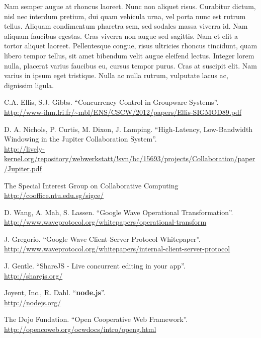 \documentclass[a4paper, 12pt, twoside]{book}
\begin{document}
Nam semper augue at rhoncus laoreet. Nunc non aliquet risus. Curabitur dictum, nisl nec interdum pretium, dui quam vehicula urna, vel porta nunc est rutrum tellus. Aliquam condimentum pharetra sem, sed sodales massa viverra id. Nam aliquam faucibus egestas. Cras viverra non augue sed sagittis. Nam et elit a tortor aliquet laoreet. Pellentesque congue, risus ultricies rhoncus tincidunt, quam libero tempor tellus, sit amet bibendum velit augue eleifend lectus. Integer lorem nulla, placerat varius faucibus eu, cursus tempor purus. Cras at suscipit elit. Nam varius in ipsum eget tristique. Nulla ac nulla rutrum, vulputate lacus ac, dignissim ligula.

\begin{thebibliography}{99}

 C.A. Ellis, S.J. Gibbs. “Concurrency Control in Groupware Systems”.
\\\url{http://www-ihm.lri.fr/~mbl/ENS/CSCW/2012/papers/Ellis-SIGMOD89.pdf}

 D. A. Nichols, P. Curtis, M. Dixon, J. Lamping. “High-Latency, Low-Bandwidth Windowing in the Jupiter Collaboration System”.
\\\url{http://lively-kernel.org/repository/webwerkstatt/!svn/bc/15693/projects/Collaboration/paper/Jupiter.pdf}

 The Special Interest Group on Collaborative Computing
\\\url{http://cooffice.ntu.edu.sg/sigce/}

 D. Wang, A. Mah, S. Lassen. “Google Wave Operational Transformation”.
\\\url{http://www.waveprotocol.org/whitepapers/operational-transform}

 J. Gregorio. “Google Wave Client-Server Protocol Whitepaper”.
\\\url{http://www.waveprotocol.org/whitepapers/internal-client-server-protocol}

 J. Gentle. “ShareJS - Live concurrent editing in your app”.
\\\url{http://sharejs.org/}

 Joyent, Inc., R. Dahl. “\textbf{node.js}”.
\\\url{http://nodejs.org/}

 The Dojo Fundation. “Open Cooperative Web Framework”.
\\\url{http://opencoweb.org/ocwdocs/intro/openg.html}


\end{thebibliography}
\end{document}
